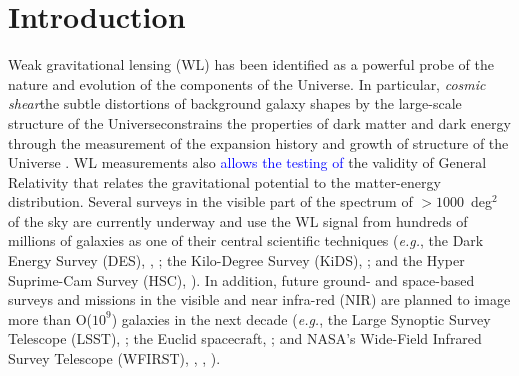 \documentclass[preprint]{aastex}
\begin{document}
\section{Introduction}
Weak gravitational lensing (WL) has been identified as a powerful probe of the nature and evolution of the components of the Universe. In particular, \emph{cosmic shear}\textemdash the subtle  distortions of background galaxy shapes by the large-scale structure of the Universe\textemdash constrains the properties of dark matter and dark energy through the measurement of the expansion history and growth of structure of the Universe \citep{refregier03, hoekstra08, kilbinger15}. WL measurements also \textcolor{blue}{allows the testing of} the validity of General Relativity that relates the gravitational potential to the matter-energy distribution. Several surveys in the visible part of the spectrum  of $>1000$~deg$^2$ of the sky are currently underway and use the WL signal from hundreds of millions of galaxies as one of their central scientific techniques (\emph{e.g.}, the Dark Energy Survey (DES), \citealt{diehl12}, \citealt{jarvis15}; the Kilo-Degree Survey (KiDS), \citealt{kuijken15}; and the Hyper Suprime-Cam Survey (HSC), \citealt{miyazaki12}). In addition, future ground- and space-based surveys and missions in the visible and near infra-red (NIR) are planned to image more than O($10^9$) galaxies in the next decade (\emph{e.g.}, the Large Synoptic Survey Telescope (LSST), \citealt{ivezic08}; the Euclid spacecraft, \citealt{laureijs11}; and NASA's Wide-Field Infrared Survey Telescope (WFIRST), \citealt{green12}, \citealt{spergel13}, \citealt{spergel15}).
\end{document}
